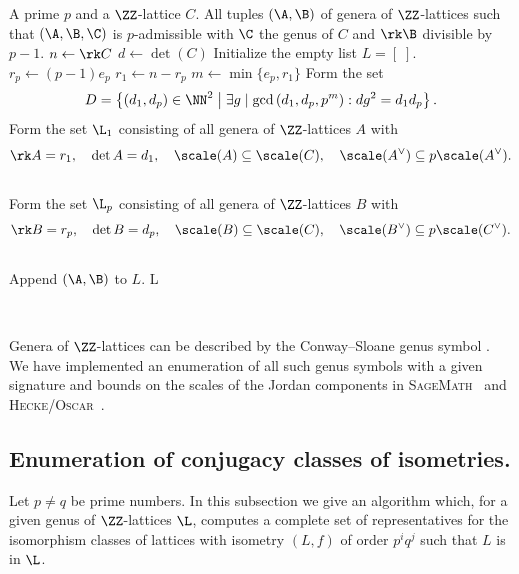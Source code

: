 \begingroup
{}\label{alg:admissible}
\endgroup
\begin{algorithmic}[1]
\REQUIRE A prime $p$ and a $\ZZ$-lattice $C$.
\ENSURE All tuples $(\A ,\B)$ of genera of $\ZZ$-lattices such that $(\A,\B,\C)$ is $p$-admissible with $\C$ the genus of $C$ and $\rk \B$ divisible by $p-1$.
\STATE $n \gets \rk C$
\STATE $d \gets \det(C)$
\STATE Initialize the empty list $L = [\;]$.
  \STATE $r_p \gets (p-1)e_p$
  \STATE $r_1 \gets n - r_p$
  \STATE $m \gets \min\{e_p,r_1\}$
  \STATE Form the set
  \[D = \left\{ (d_1,d_p) \in \NN^2 \;\middle|\; \exists g \mid\gcd\left(d_1,d_p,p^m\right): dg^2=d_1 d_p\right\}.\]
    \STATE Form the set $\L_1$ consisting of all genera of $\ZZ$-lattices $A$ with
    \[\rk A = r_1, \quad \det A = d_1,\quad  \scale(A) \subseteq \scale(C),\quad  \scale(A^\vee)\subseteq p\scale(A^\vee).\]
    \\[-10pt]
    \STATE Form the set $\L_p$ consisting of all genera of $\ZZ$-lattices $B$ with
    \[\rk B = r_p, \quad \det B = d_p,\quad  \scale(B) \subseteq \scale(C),\quad  \scale(B^\vee)\subseteq p\scale(C^\vee).\]
    \\[-10pt]
        \STATE Append $(\A,\B)$ to $L$.
      \ENDIF
    \ENDFOR
  \ENDFOR
\ENDFOR
\RETURN L
\end{algorithmic}\hrulefill\\

\begin{remark}
  Genera of $\ZZ$-lattices can be described by the Conway--Sloane genus symbol \cite[15 \S 7]{splag}. We have implemented an enumeration of all such genus symbols with a given signature and bounds on the scales of the Jordan components in \textsc{SageMath}~\cite{sagemath} and \textsc{Hecke}/\textsc{Oscar}~\cite{hecke}.
\end{remark}

\subsection{Enumeration of conjugacy classes of isometries.}\label{enumconj}
Let $p\neq q$ be prime numbers.
In this subsection we give an algorithm which, for a given genus of $\ZZ$-lattices $\L$, computes a complete set of representatives for the isomorphism classes of lattices with isometry $(L,f)$ of order $p^i q^j$ such that $L$ is in $\L$.


